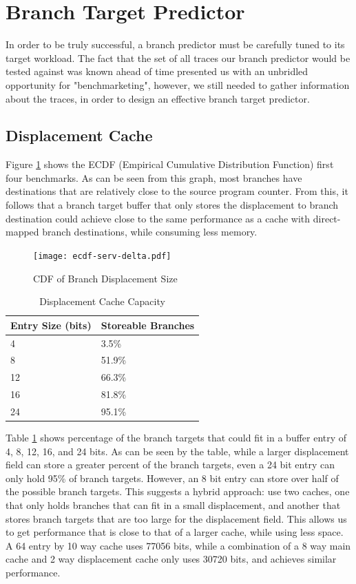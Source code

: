 \documentclass[twocolumn]{article}
\newcommand{\centerimage}[3]{
\begin{figure}[ht!]  
\begin{center} #1
\caption{#2}
\label{#3}
\end{center}
\end{figure}}
\begin{document}
\section{Branch Target Predictor} 

In order to be truly successful, a branch predictor must be carefully
tuned to its target workload. The fact that the set of all traces our
branch predictor would be tested against was known ahead of time
presented us with an unbridled opportunity for "benchmarketing",
however, we still needed to gather information about the traces, in
order to design an effective branch target predictor. 

\subsection{Displacement Cache}
Figure \ref{ddelta} shows the ECDF (Empirical Cumulative 
Distribution Function) first four benchmarks. As can be 
seen from this graph, most branches have destinations that 
are relatively close to the source program counter. From 
this, it follows that a branch target buffer that only 
stores the displacement to branch destination could achieve 
close to the same performance as a cache with direct-mapped 
branch destinations, while consuming less memory. 

\centerimage{\texttt{[image: ecdf-serv-delta.pdf]}}{CDF
  of Branch Displacement Size}{ddelta}


\begin{table}\begin{center}\begin{tabular}{ll}

Entry Size (bits) & Storeable Branches \\
\hline
4 & 3.5\% \\
8 & 51.9\% \\
12 & 66.3\% \\
16 & 81.8\% \\
24 & 95.1\% 
\end{tabular}\end{center}
\caption{Displacement Cache Capacity}
\label{dtable}
\end{table}

Table \ref{dtable} shows percentage of the branch targets that could
fit in a buffer entry of 4, 8, 12, 16, and 24 bits. As can be seen by
the table, while a larger displacement field can store a greater
percent of the branch targets, even a 24 bit entry can only hold 95\%
of branch targets. However, an 8 bit entry can store over half of the
possible branch targets. This suggests a hybrid approach: use two
caches, one that only holds branches that can fit in a small
displacement, and another that stores branch targets that are too
large for the displacement field. This allows us to get performance
that is close to that of a larger cache, while using less space. A 64
entry by 10 way cache uses 77056 bits, while a combination of a 8 way
main cache and 2 way displacement cache only uses 30720 bits, and
achieves similar performance.
\end{document}
